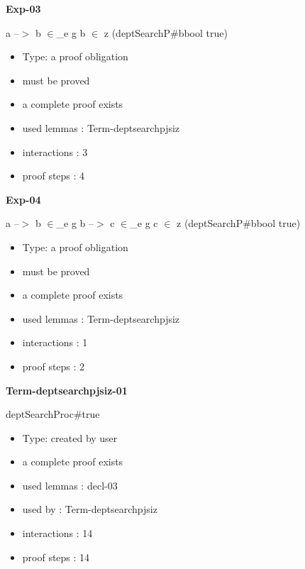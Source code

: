 {\medskip

{\LARGE\bf Exp-03}

\medskip

 \Fol a --$>$ b $\in$\_e g \And b $\in$ z \Imp (\Do deptSearchP\#\Dc bbool \Equiv true)

\begin{itemize}

\item Type: a proof obligation

\item       must be proved
\item       a complete proof exists
\item       used lemmas  : Term-deptsearchpjsiz
\item       interactions : 3
\item       proof steps  : 4
\end{itemize}

\medskip

{\LARGE\bf Exp-04}

\medskip

 \Fol a --$>$ b $\in$\_e g \And b --$>$ c $\in$\_e g \And c $\in$ z \Imp (\Do deptSearchP\#\Dc bbool \Equiv true)

\begin{itemize}

\item Type: a proof obligation

\item       must be proved
\item       a complete proof exists
\item       used lemmas  : Term-deptsearchpjsiz
\item       interactions : 1
\item       proof steps  : 2
\end{itemize}

\medskip

{\LARGE\bf Term-deptsearchpjsiz-01}

\medskip

 \Fol \Do deptSearchProc\#\Dc true

\begin{itemize}

\item Type: created by user

\item       a complete proof exists
\item       used lemmas  : decl-03
\item       used by      : Term-deptsearchpjsiz
\item       interactions : 14
\item       proof steps  : 14
\end{itemize}


}
